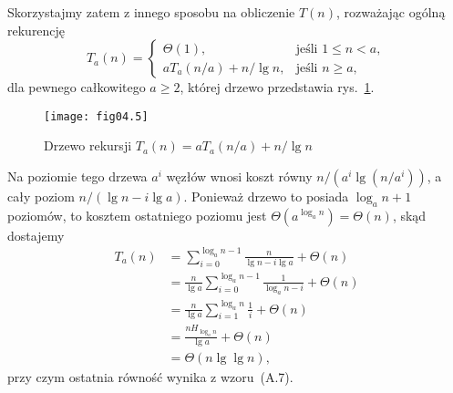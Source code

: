 Skorzystajmy zatem z innego sposobu na obliczenie $T(n)$, rozważając ogólną rekurencję
\[
	T_a(n) = \begin{cases}
		\Theta(1), & \text{jeśli $1\le n<a$}, \\
		aT_a(n/a)+n/\!\lg n, & \text{jeśli $n\ge a$},
	\end{cases}
\]
dla pewnego całkowitego $a\ge2$, której drzewo przedstawia rys.~\ref{fig:4-4b}.
\begin{figure}[ht]
	\begin{center}
		\texttt{[image: fig04.5]}
	\end{center}
	\caption{Drzewo rekursji $T_a(n)=aT_a(n/a)+n/\!\lg n$} \label{fig:4-4b}
\end{figure}
Na  poziomie tego drzewa $a^i$ węzłów wnosi koszt równy $n/(a^i\lg(n/a^i))$, a cały poziom $n/(\lg n-i\lg a)$. Ponieważ drzewo to posiada $\log_an+1$ poziomów, to kosztem ostatniego poziomu jest $\Theta(a^{\log_an})=\Theta(n)$, skąd dostajemy
\begin{align*}
	T_a(n) &= \sum_{i=0}^{\log_an-1}\frac{n}{\lg n-i\lg a}+\Theta(n) \\
	&= \frac{n}{\lg a}\sum_{i=0}^{\log_an-1}\frac{1}{\log_an-i}+\Theta(n) \\
	&= \frac{n}{\lg a}\sum_{i=1}^{\log_an}\frac{1}{i}+\Theta(n) \\
	&= \frac{nH_{\log_an}}{\lg a}+\Theta(n) \\
	&= \Theta(n\lg\lg n),
\end{align*}
przy czym ostatnia równość wynika z wzoru~(A.7).

